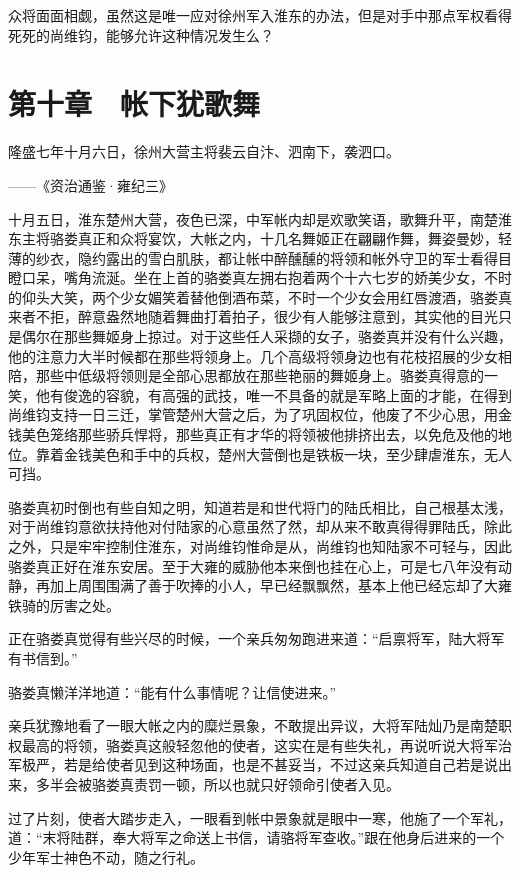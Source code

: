 众将面面相觑，虽然这是唯一应对徐州军入淮东的办法，但是对手中那点军权看得死死的尚维钧，能够允许这种情况发生么？

\chapter{第十章　帐下犹歌舞}

隆盛七年十月六日，徐州大营主将裴云自汴、泗南下，袭泗口。

——《资治通鉴·雍纪三》

十月五日，淮东楚州大营，夜色已深，中军帐内却是欢歌笑语，歌舞升平，南楚淮东主将骆娄真正和众将宴饮，大帐之内，十几名舞姬正在翩翩作舞，舞姿曼妙，轻薄的纱衣，隐约露出的雪白肌肤，都让帐中醉醺醺的将领和帐外守卫的军士看得目瞪口呆，嘴角流涎。坐在上首的骆娄真左拥右抱着两个十六七岁的娇美少女，不时的仰头大笑，两个少女媚笑着替他倒酒布菜，不时一个少女会用红唇渡酒，骆娄真来者不拒，醉意盎然地随着舞曲打着拍子，很少有人能够注意到，其实他的目光只是偶尔在那些舞姬身上掠过。对于这些任人采撷的女子，骆娄真并没有什么兴趣，他的注意力大半时候都在那些将领身上。几个高级将领身边也有花枝招展的少女相陪，那些中低级将领则是全部心思都放在那些艳丽的舞姬身上。骆娄真得意的一笑，他有俊逸的容貌，有高强的武技，唯一不具备的就是军略上面的才能，在得到尚维钧支持一日三迁，掌管楚州大营之后，为了巩固权位，他废了不少心思，用金钱美色笼络那些骄兵悍将，那些真正有才华的将领被他排挤出去，以免危及他的地位。靠着金钱美色和手中的兵权，楚州大营倒也是铁板一块，至少肆虐淮东，无人可挡。

骆娄真初时倒也有些自知之明，知道若是和世代将门的陆氏相比，自己根基太浅，对于尚维钧意欲扶持他对付陆家的心意虽然了然，却从来不敢真得得罪陆氏，除此之外，只是牢牢控制住淮东，对尚维钧惟命是从，尚维钧也知陆家不可轻与，因此骆娄真正好在淮东安居。至于大雍的威胁他本来倒也挂在心上，可是七八年没有动静，再加上周围围满了善于吹捧的小人，早已经飘飘然，基本上他已经忘却了大雍铁骑的厉害之处。

正在骆娄真觉得有些兴尽的时候，一个亲兵匆匆跑进来道：“启禀将军，陆大将军有书信到。”

骆娄真懒洋洋地道：“能有什么事情呢？让信使进来。”

亲兵犹豫地看了一眼大帐之内的糜烂景象，不敢提出异议，大将军陆灿乃是南楚职权最高的将领，骆娄真这般轻忽他的使者，这实在是有些失礼，再说听说大将军治军极严，若是给使者见到这种场面，也是不甚妥当，不过这亲兵知道自己若是说出来，多半会被骆娄真责罚一顿，所以也就只好领命引使者入见。

过了片刻，使者大踏步走入，一眼看到帐中景象就是眼中一寒，他施了一个军礼，道：“末将陆群，奉大将军之命送上书信，请骆将军查收。”跟在他身后进来的一个少年军士神色不动，随之行礼。


